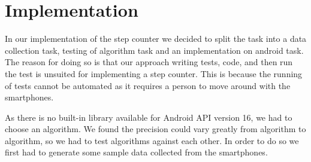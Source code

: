 \section{Implementation}
In our implementation of the step counter we decided to split the task into a data collection task, testing of algorithm task and an implementation on android task. The reason for doing so is that our approach writing tests, code, and then run the test is unsuited for implementing a step counter. This is because the running of tests cannot be automated as it requires a person to move around with the smartphones.

As there is no built-in library available for Android API version 16, we had to choose an algorithm. We found the precision could vary greatly from algorithm to algorithm, so we had to test algorithms against each other. In order to do so we first had to generate some sample data collected from the smartphones.

